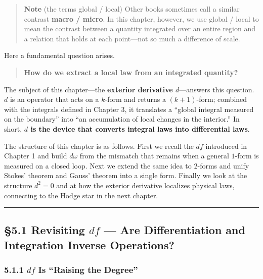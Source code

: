 \begin{quote}
\textbf{Note} (the terms global / local) Other books sometimes call a
similar contrast \textbf{macro / micro}. In this chapter, however, we
use global / local to mean the contrast between a quantity integrated
over an entire region and a relation that holds at each point---not so
much a difference of scale.
\end{quote}

Here a fundamental question arises.

\begin{quote}
\textbf{How do we extract a local law from an integrated quantity?}
\end{quote}

The subject of this chapter---the
\textbf{exterior derivative $d$}---answers this question. \(d\) is an
operator that acts on a \(k\)-form and returns a \((k+1)\)-form;
combined with the integrals defined in Chapter 3, it translates a
``global integral measured on the boundary'' into ``an accumulation of
local changes in the interior.'' In short,
\textbf{$d$ is the device that converts integral laws into differential laws}.

The structure of this chapter is as follows. First we recall the \(df\)
introduced in Chapter 1 and build \(d\omega\) from the mismatch that
remains when a general \(1\)-form is measured on a closed loop. Next we
extend the same idea to \(2\)-forms and unify Stokes' theorem and Gauss'
theorem into a single form. Finally we look at the structure \(d^2=0\)
and at how the exterior derivative localizes physical laws, connecting
to the Hodge star in the next chapter.

\begin{center}\rule{0.5\linewidth}{0.5pt}\end{center}

\hypertarget{revisiting-df-are-differentiation-and-integration-inverse-operations}{%
\subsection{\texorpdfstring{§5.1 Revisiting \(df\) --- Are
Differentiation and Integration Inverse
Operations?}{§5.1 Revisiting df --- Are Differentiation and Integration Inverse Operations?}}\label{revisiting-df-are-differentiation-and-integration-inverse-operations}}

\hypertarget{df-is-raising-the-degree}{%
\subsubsection{\texorpdfstring{5.1.1 \(df\) Is ``Raising the
Degree''}{5.1.1 df Is ``Raising the Degree''}}\label{df-is-raising-the-degree}}

